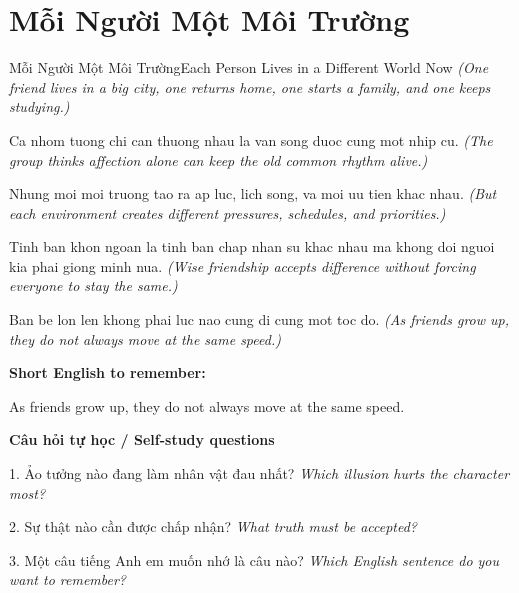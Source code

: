 \section{Mỗi Người Một Môi Trường}
\begin{truyen}{Mỗi Người Một Môi Trường}{Each Person Lives in a Different World Now}
\textit{(One friend lives in a big city, one returns home, one starts a family, and one keeps studying.)}

Ca nhom tuong chi can thuong nhau la van song duoc cung mot nhip cu.
\textit{(The group thinks affection alone can keep the old common rhythm alive.)}

Nhung moi moi truong tao ra ap luc, lich song, va moi uu tien khac nhau.
\textit{(But each environment creates different pressures, schedules, and priorities.)}

Tinh ban khon ngoan la tinh ban chap nhan su khac nhau ma khong doi nguoi kia phai giong minh nua.
\textit{(Wise friendship accepts difference without forcing everyone to stay the same.)}

\end{truyen}

\begin{baihoc}
Ban be lon len khong phai luc nao cung di cung mot toc do.
\textit{(As friends grow up, they do not always move at the same speed.)}
\end{baihoc}

\begin{ghinhoanh}
\textbf{Short English to remember:}

As friends grow up, they do not always move at the same speed.

\end{ghinhoanh}

\begin{tuhocnhanh}
\textbf{Câu hỏi tự học / Self-study questions}

1. Ảo tưởng nào đang làm nhân vật đau nhất? \textit{Which illusion hurts the character most?}

2. Sự thật nào cần được chấp nhận? \textit{What truth must be accepted?}

3. Một câu tiếng Anh em muốn nhớ là câu nào? \textit{Which English sentence do you want to remember?}
\end{tuhocnhanh}
\ngancach

